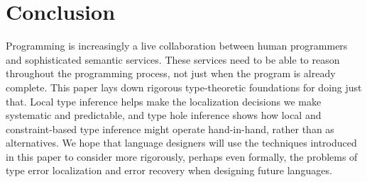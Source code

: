 \section{Conclusion}
\label{sec:conclusion}

Programming is increasingly a live collaboration between human programmers and sophisticated semantic services. 
These services need to be able to reason throughout the programming process, not just when the program is already complete. This paper lays down rigorous type-theoretic foundations for doing just that. Local type inference helps make the localization decisions we make systematic and predictable, and type hole inference shows how local and constraint-based type inference might operate hand-in-hand, rather than as alternatives. 
We hope that language designers will use the techniques introduced in this paper to consider more rigorously, perhaps even formally, the problems of type error localization and error recovery when designing future languages. 